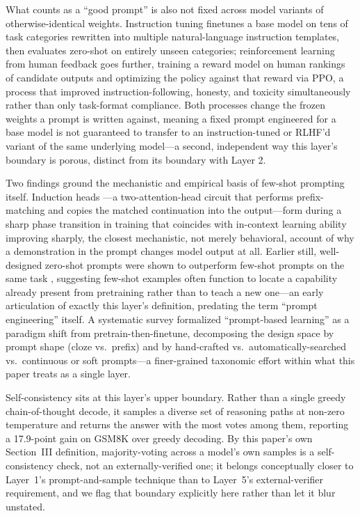 \documentclass[journal]{IEEEtran}
\begin{document}
What counts as a ``good prompt'' is also not fixed across model variants of otherwise-identical weights. Instruction tuning \cite{wei2021finetuned} finetunes a base model on tens of task categories rewritten into multiple natural-language instruction templates, then evaluates zero-shot on entirely unseen categories; reinforcement learning from human feedback \cite{ouyang2022training} goes further, training a reward model on human rankings of candidate outputs and optimizing the policy against that reward via PPO, a process that improved instruction-following, honesty, and toxicity simultaneously rather than only task-format compliance. Both processes change the frozen weights a prompt is written against, meaning a fixed prompt engineered for a base model is not guaranteed to transfer to an instruction-tuned or RLHF'd variant of the same underlying model---a second, independent way this layer's boundary is porous, distinct from its boundary with Layer 2.

Two findings ground the mechanistic and empirical basis of few-shot prompting itself. Induction heads \cite{olsson2022incontext}---a two-attention-head circuit that performs prefix-matching and copies the matched continuation into the output---form during a sharp phase transition in training that coincides with in-context learning ability improving sharply, the closest mechanistic, not merely behavioral, account of why a demonstration in the prompt changes model output at all. Earlier still, well-designed zero-shot prompts were shown to outperform few-shot prompts on the same task \cite{reynolds2021prompt}, suggesting few-shot examples often function to locate a capability already present from pretraining rather than to teach a new one---an early articulation of exactly this layer's definition, predating the term ``prompt engineering'' itself. A systematic survey \cite{liu2021pretrain} formalized ``prompt-based learning'' as a paradigm shift from pretrain-then-finetune, decomposing the design space by prompt shape (cloze vs.\ prefix) and by hand-crafted vs.\ automatically-searched vs.\ continuous or soft prompts---a finer-grained taxonomic effort within what this paper treats as a single layer.

Self-consistency \cite{wang2022selfconsistency} sits at this layer's upper boundary. Rather than a single greedy chain-of-thought decode, it samples a diverse set of reasoning paths at non-zero temperature and returns the answer with the most votes among them, reporting a 17.9-point gain on GSM8K over greedy decoding. By this paper's own Section~III definition, majority-voting across a model's own samples is a self-consistency check, not an externally-verified one; it belongs conceptually closer to Layer~1's prompt-and-sample technique than to Layer~5's external-verifier requirement, and we flag that boundary explicitly here rather than let it blur unstated.
\end{document}
